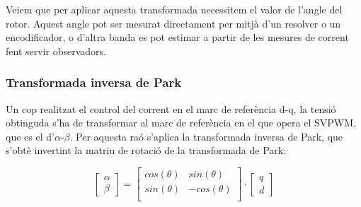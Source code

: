 {{        Veiem que per aplicar aquesta transformada necessitem el valor de
        l'angle del rotor. Aquest angle pot ser mesurat directament per mitjà
        d'un resolver o un encodificador, o d'altra banda es pot estimar a
        partir de les mesures de corrent fent servir observadors.
    }

    \subsubsection{ Transformada inversa de Park }
    {
        Un cop realitzat el control del corrent en el marc de referència d-q,
        la tensió obtinguda s'ha de transformar al marc de referència en el que
        opera el SVPWM, que es el d'$\alpha$-$\beta$. Per aquesta raó s'aplica
        la transformada inversa de Park, que s'obtè invertint la matriu de
        rotació de la transformada de Park:

        \begin{equation}
            \begin{bmatrix} \alpha \\[5pt] \beta \end{bmatrix} = 
            \begin{bmatrix}
                cos(\theta) & sin(\theta) \\[5pt]
                sin(\theta) & -cos(\theta) \\[5pt]
            \end{bmatrix}
            \cdot \begin{bmatrix} q \\[5pt] d \end{bmatrix} 
        \end{equation}
    }
}

